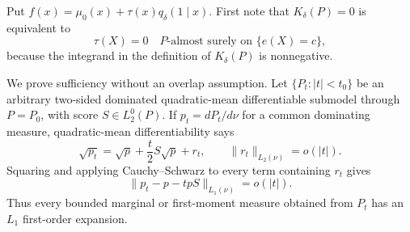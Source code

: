 Put \(f(x)=\mu _0(x)+\tau(x)q_\delta(1\mid x)\).  First note that \(K_\delta(P)=0\) is equivalent to
\begin{equation}
 \tau(X)=0\quad P\text{-almost surely on }\{e(X)=c\},                                      \tag{1}
\end{equation}
because the integrand in the definition of \(K_\delta(P)\) is nonnegative.

We prove sufficiency without an overlap assumption.  Let \(\{P_t:|t|<t_0\}\) be an arbitrary two-sided dominated quadratic-mean differentiable submodel through \(P=P_0\), with score \(S\in L_2^0(P)\).  If \(p_t=dP_t/d\nu\) for a common dominating measure, quadratic-mean differentiability says
\begin{equation}
 \sqrt{p_t}=\sqrt p+\frac t2S\sqrt p+r_t,\qquad \|r_t\|_{L_2(\nu)}=o(|t|).
\end{equation}
Squaring and applying Cauchy--Schwarz to every term containing \(r_t\) gives
\begin{equation}
 \|p_t-p-tpS\|_{L_1(\nu)}=o(|t|).                                                        \tag{2}
\end{equation}
Thus every bounded marginal or first-moment measure obtained from \(P_t\) has an \(L_1\) first-order expansion.

